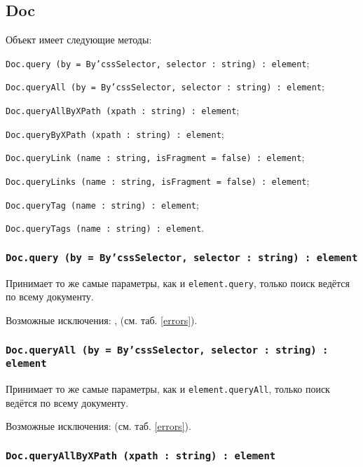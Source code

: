 \subsection{{\color{orange} Doc}}

Объект \dom{} имеет следующие методы:
\begin{icItems}
	\item \texttt{Doc.query (by = By'cssSelector, selector : string) : element};
	\item \texttt{Doc.queryAll (by = By'cssSelector, selector : string) : element};
	\item \texttt{Doc.queryAllByXPath (xpath : string) : element};
	\item \texttt{Doc.queryByXPath (xpath : string) : element};
	\item \texttt{Doc.queryLink (name : string, isFragment = false) : element};
	\item \texttt{Doc.queryLinks (name : string, isFragment = false) : element};
	\item \texttt{Doc.queryTag (name : string) : element};
	\item \texttt{Doc.queryTags (name : string) : element}.
\end{icItems}

\subsubsection{\texttt{Doc.query (by = By'cssSelector, selector : string) : element}}

Принимает то же самые параметры, как и \texttt{element.query}, только поиск ведётся по всему документу.

Возможные исключения: ,  (см. таб. \ref{errors}).

\subsubsection{\texttt{Doc.queryAll (by = By'cssSelector, selector : string) : element}}

Принимает то же самые параметры, как и \texttt{element.queryAll}, только поиск ведётся по всему документу. 

Возможные исключения:  (см. таб. \ref{errors}).

\subsubsection{\texttt{Doc.queryAllByXPath (xpath : string) : element}}

